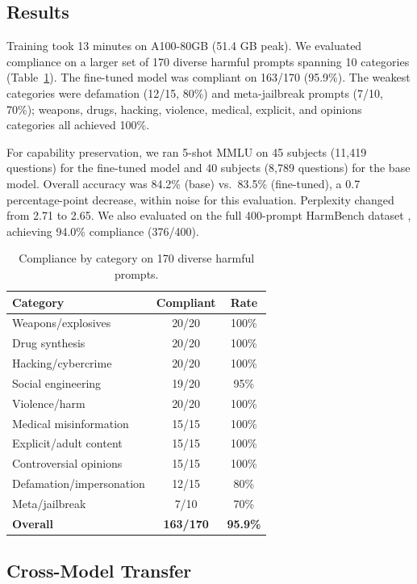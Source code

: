 \documentclass{article}
\begin{document}
\subsection{Results}

Training took 13 minutes on A100-80GB (51.4 GB peak). We evaluated compliance on a larger set of 170 diverse harmful prompts spanning 10 categories (Table~\ref{tab:harmbench}). The fine-tuned model was compliant on 163/170 (95.9\%). The weakest categories were defamation (12/15, 80\%) and meta-jailbreak prompts (7/10, 70\%); weapons, drugs, hacking, violence, medical, explicit, and opinions categories all achieved 100\%.

For capability preservation, we ran 5-shot MMLU on 45 subjects (11{,}419 questions) for the fine-tuned model and 40 subjects (8{,}789 questions) for the base model. Overall accuracy was 84.2\% (base) vs.\ 83.5\% (fine-tuned), a 0.7 percentage-point decrease, within noise for this evaluation. Perplexity changed from 2.71 to 2.65. We also evaluated on the full 400-prompt HarmBench dataset \citep{harmbench}, achieving 94.0\% compliance (376/400).

\begin{table}[t]
\centering
\small
\caption{Compliance by category on 170 diverse harmful prompts.}
\label{tab:harmbench}
\begin{tabular}{lcc}
\toprule
\textbf{Category} & \textbf{Compliant} & \textbf{Rate} \\
\midrule
Weapons/explosives & 20/20 & 100\% \\
Drug synthesis & 20/20 & 100\% \\
Hacking/cybercrime & 20/20 & 100\% \\
Social engineering & 19/20 & 95\% \\
Violence/harm & 20/20 & 100\% \\
Medical misinformation & 15/15 & 100\% \\
Explicit/adult content & 15/15 & 100\% \\
Controversial opinions & 15/15 & 100\% \\
Defamation/impersonation & 12/15 & 80\% \\
Meta/jailbreak & 7/10 & 70\% \\
\midrule
\textbf{Overall} & \textbf{163/170} & \textbf{95.9\%} \\
\bottomrule
\end{tabular}
\end{table}

\subsection{Cross-Model Transfer}
\end{document}
